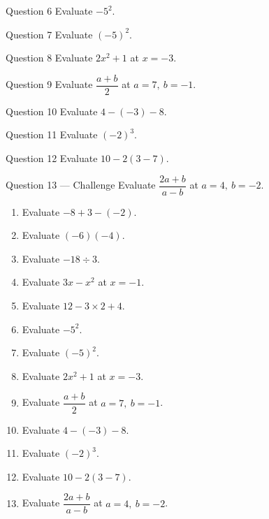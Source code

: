 \documentclass[11pt]{article}
\begin{document}
\begin{qbox}{Question 6}
Evaluate $-5^2$.\workspace{1.8cm}
\end{qbox}

\begin{qbox}{Question 7}
Evaluate $(-5)^2$.\workspace{1.8cm}
\end{qbox}

\begin{qbox}{Question 8}
Evaluate $2x^2+1$ at $x=-3$.\workspace{2.0cm}
\end{qbox}

\begin{qbox}{Question 9}
Evaluate $\dfrac{a+b}{2}$ at $a=7,\ b=-1$.\workspace{2.0cm}
\end{qbox}

\begin{qbox}{Question 10}
Evaluate $4-(-3)-8$.\workspace{1.8cm}
\end{qbox}

\begin{qbox}{Question 11}
Evaluate $(-2)^3$.\workspace{1.8cm}
\end{qbox}

\begin{qbox}{Question 12}
Evaluate $10-2(3-7)$.\workspace{2.0cm}
\end{qbox}

\begin{qbox}{Question 13 --- Challenge}
Evaluate $\dfrac{2a+b}{a-b}$ at $a=4,\ b=-2$.\workspace{2.4cm}
\end{qbox}

\clearpage
{}

\begin{recapbox}
\begin{multicols}{2}
\small
\begin{enumerate}[leftmargin=*,itemsep=3pt]
  \item Evaluate $-8+3-(-2)$.
  \item Evaluate $(-6)(-4)$.
  \item Evaluate $-18\div3$.
  \item Evaluate $3x-x^2$ at $x=-1$.
  \item Evaluate $12-3\times2+4$.
  \item Evaluate $-5^2$.
  \item Evaluate $(-5)^2$.
  \item Evaluate $2x^2+1$ at $x=-3$.
  \item Evaluate $\dfrac{a+b}{2}$ at $a=7,\ b=-1$.
  \item Evaluate $4-(-3)-8$.
  \item Evaluate $(-2)^3$.
  \item Evaluate $10-2(3-7)$.
  \item Evaluate $\dfrac{2a+b}{a-b}$ at $a=4,\ b=-2$.
\end{enumerate}
\end{multicols}
\end{recapbox}
\end{document}
